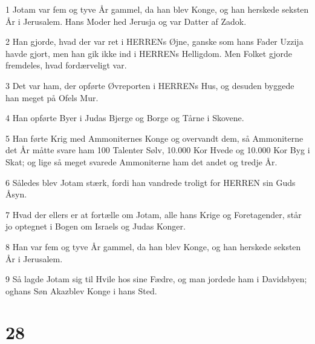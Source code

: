 \par 1 Jotam var fem og tyve År gammel, da han blev Konge, og han herskede seksten År i Jerusalem. Hans Moder hed Jerusja og var Datter af Zadok.
\par 2 Han gjorde, hvad der var ret i HERRENs Øjne, ganske som hans Fader Uzzija havde gjort, men han gik ikke ind i HERRENs Helligdom. Men Folket gjorde fremdeles, hvad fordærveligt var.
\par 3 Det var ham, der opførte Øvreporten i HERRENs Hus, og desuden byggede han meget på Ofels Mur.
\par 4 Han opførte Byer i Judas Bjerge og Borge og Tårne i Skovene.
\par 5 Han førte Krig med Ammoniternes Konge og overvandt dem, så Ammoniterne det År måtte svare ham 100 Talenter Sølv, 10.000 Kor Hvede og 10.000 Kor Byg i Skat; og lige så meget svarede Ammoniterne ham det andet og tredje År.
\par 6 Således blev Jotam stærk, fordi han vandrede troligt for HERREN sin Guds Åsyn.
\par 7 Hvad der ellers er at fortælle om Jotam, alle hans Krige og Foretagender, står jo optegnet i Bogen om Israels og Judas Konger.
\par 8 Han var fem og tyve År gammel, da han blev Konge, og han herskede seksten År i Jerusalem.
\par 9 Så lagde Jotam sig til Hvile hos sine Fædre, og man jordede ham i Davidsbyen; oghans Søn Akazblev Konge i hans Sted.

\chapter{28}

